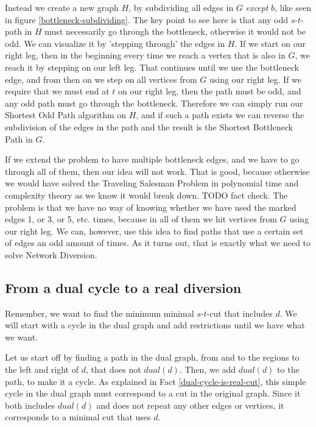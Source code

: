 Instead we create a new graph $H$, by subdividing all edges in $G$ \emph{except} $b$, like seen in figure \ref{bottleneck-subdividing}. The key point to see here is that any odd $s$-$t$-path in $H$ must necessarily go through the bottleneck, otherwise it would not be odd. We can visualize it by 'stepping through' the edges in $H$. If we start on our right leg, then in the beginning every time we reach a vertex that is also in $G$, we reach it by stepping on our left leg. That continues until we use the bottleneck edge, and from then on we step on all vertices from $G$ using our right leg. If we require that we must end at $t$ on our right leg, then the path must be odd, and any odd path must go through the bottleneck. Therefore we can simply run our Shortest Odd Path algorithm on $H$, and if such a path exists we can reverse the subdivision of the edges in the path and the result is the Shortest Bottleneck Path in $G$.

If we extend the problem to have multiple bottleneck edges, and we have to go through all of them, then our idea will not work. That is good, because otherwise we would have solved the Traveling Salesman Problem in polynomial time and complexity theory as we know it would break down. TODO fact check.
The problem is that we have no way of knowing whether we have used the marked edges 1, or 3, or 5, etc. times, because in all of them we hit vertices from $G$ using our right leg. We can, however, use this idea to find paths that use a certain set of edges an odd amount of times. As it turns out, that is exactly what we need to solve Network Diversion.

\subsection{From a dual cycle to a real diversion} %
Remember, we want to find the minimum minimal $s$-$t$-cut that includes $d$. We will start with a cycle in the dual graph and add restrictions until we have what we want.

Let us start off by finding a path in the dual graph, from and to the regions to the left and right of $d$, that does not $dual(d)$. Then, we add $dual(d)$ to the path, to make it a cycle. As explained in Fact \ref{dual-cycle-is-real-cut}, this simple cycle in the dual graph must correspond to a cut in the original graph. Since it both includes $dual(d)$ and does not repeat any other edges or vertices, it corresponds to a minimal cut that uses $d$.

